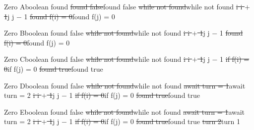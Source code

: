 \begin{wideslide}[bm=,toc=]{\large }
\begin{alg}{Zero A}{boolean found}\hline
{}
\st{found \la{} false}{found \la{} false}
\st{while not found}{while not found}
\st{\idt{}i \la{} i $+$ 1}{\idt{}j \la{} j $-$ 1}
\st{\idt{}found \la{} f(i) = 0}{\idt{}found \la{} f(j) = 0}
\end{alg}
\end{wideslide}

\begin{wideslide}[bm=,toc=]{\large }
\begin{alg}{Zero B}{boolean found \la{} false}\hline
{}
\st{while not found}{while not found}
\st{\idt{}i \la{} i $+$ 1}{\idt{}j \la{} j $-$ 1}
\st{\idt{}found \la{} f(i) = 0}{\idt{}found \la{} f(j) = 0}
\end{alg}
\end{wideslide}

\begin{wideslide}[bm=,toc=]{\large }
\begin{alg}{Zero C}{boolean found \la{} false}\hline
{}
\st{while not found}{while not found}
\st{\idt{}i \la{} i $+$ 1}{\idt{}j \la{} j $-$ 1}
\st{\idt{}if f(i) = 0}{\idt{}if f(j) = 0}
\st{\idt{}\idt{}found \la{} true}{\idt{}\idt{}found \la{} true}
\end{alg}
\end{wideslide}

\begin{wideslide}[bm=,toc=]{\large }
\begin{alg}{Zero D}{boolean found \la{} false}
\hline
{}
\st{while not found}{while not found}
\st{\idt{}await turn = 1}{\idt{}await turn = 2}
\st{\idt{}i \la{} i $+$ 1}{\idt{}j \la{} j $-$ 1}
\st{\idt{}if f(i) = 0}{\idt{}if f(j) = 0}
\st{\idt{}\idt{}found \la{} true}{\idt{}\idt{}found \la{} true}
\end{alg}
\end{wideslide}

\begin{wideslide}[bm=,toc=]{\large }
\begin{alg}{Zero E}{boolean found \la{} false}
\hline
{}
\st{while not found}{while not found}
\st{\idt{}await turn = 1}{\idt{}await turn = 2}
\st{\idt{}i \la{} i $+$ 1}{\idt{}j \la{} j $-$ 1}
\st{\idt{}if f(i) = 0}{\idt{}if f(j) = 0}
\st{\idt{}\idt{}found \la{} true}{\idt{}\idt{}found \la{} true}
\st{turn \la{} 2}{turn \la{} 1}
\end{alg}
\end{wideslide}

